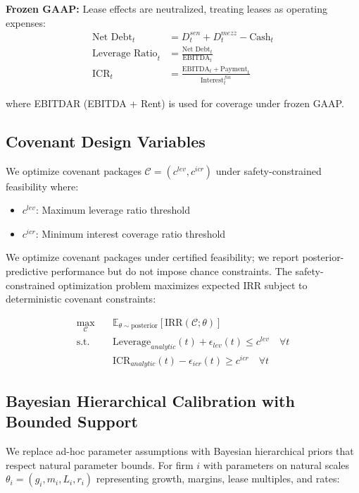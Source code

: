 \documentclass[11pt,a4paper]{article}
\newcommand{\E}{\mathbb{E}}
\begin{document}
\textbf{Frozen GAAP:} Lease effects are neutralized, treating leases as operating expenses:
\begin{align}
\text{Net Debt}_t &= D_t^{sen} + D_t^{mezz} - \text{Cash}_t \\
\text{Leverage Ratio}_t &= \frac{\text{Net Debt}_t}{\text{EBITDA}_t} \\
\text{ICR}_t &= \frac{\text{EBITDA}_t + \text{Payment}_t}{\text{Interest}_t^{fin}}
\end{align}

where EBITDAR (EBITDA + Rent) is used for coverage under frozen GAAP.

\subsection{Covenant Design Variables}

We optimize covenant packages $\mathcal{C} = (c^{lev}, c^{icr})$ under safety-constrained feasibility where:
\begin{itemize}
\item $c^{lev}$: Maximum leverage ratio threshold
\item $c^{icr}$: Minimum interest coverage ratio threshold  
\end{itemize}

We optimize covenant packages under certified feasibility; we report posterior-predictive performance but do not impose chance constraints. The safety-constrained optimization problem maximizes expected IRR subject to deterministic covenant constraints:

\begin{align}
\max_{\mathcal{C}} \quad &\E_{\theta \sim \text{posterior}}[\text{IRR}(\mathcal{C};\theta)] \\
\text{s.t.} \quad &\text{Leverage}_{analytic}(t) + \epsilon_{lev}(t) \leq c^{lev} \quad \forall t \\
&\text{ICR}_{analytic}(t) - \epsilon_{icr}(t) \geq c^{icr} \quad \forall t
\end{align}

\subsection{Bayesian Hierarchical Calibration with Bounded Support}

We replace ad-hoc parameter assumptions with Bayesian hierarchical priors that respect natural parameter bounds. For firm $i$ with parameters on natural scales $\theta_i = (g_i, m_i, L_i, r_i)$ representing growth, margins, lease multiples, and rates:
\end{document}
